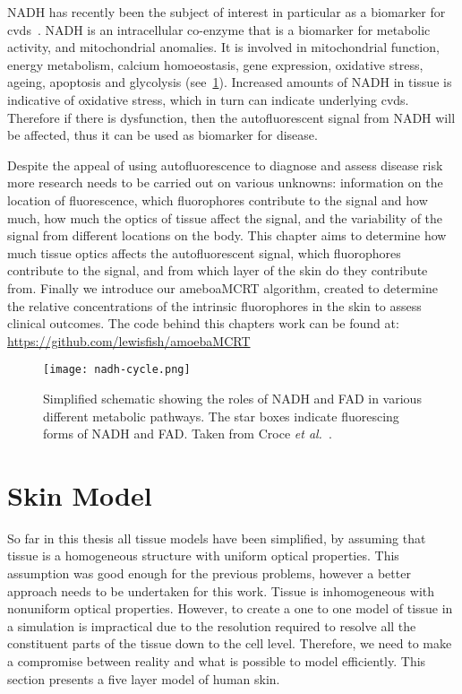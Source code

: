 NADH has recently been the subject of interest in particular as a biomarker for \gls*{cvds}~\cite{akbar2014vivo,elahi2009oxidative,blacker2016investigating}.
NADH is an intracellular co-enzyme that is a biomarker for metabolic activity, and mitochondrial anomalies. 
It is involved in mitochondrial function, energy metabolism, calcium homoeostasis, gene expression, oxidative stress, ageing, apoptosis and glycolysis (see~\cref{fig:nadhfadpath}).
Increased amounts of NADH in tissue is indicative of oxidative stress, which in turn can indicate underlying \gls*{cvds}.
Therefore if there is dysfunction, then the autofluorescent signal from NADH will be affected, thus it can be used as biomarker for disease.

Despite the appeal of using autofluorescence to diagnose and assess disease risk more research needs to be carried out on various unknowns: information on the location of fluorescence, which fluorophores contribute to the signal and how much, how much the optics of tissue affect the signal, and the variability of the signal from different locations on the body.
This chapter aims to determine how much tissue optics affects the autofluorescent signal, which fluorophores contribute to the signal, and from which layer of the skin do they contribute from.
Finally we introduce our ameboaMCRT algorithm, created to determine the relative concentrations of the intrinsic fluorophores in the skin to assess clinical outcomes.
The code behind this chapters work can be found at: \url{https://github.com/lewisfish/amoebaMCRT}

\begin{figure}[!htpb]
  \centering
  \texttt{[image: nadh-cycle.png]}
  \caption{Simplified schematic showing the roles of NADH and FAD in various different metabolic pathways. The star boxes indicate fluorescing forms of NADH and FAD. Taken from Croce \textit{et al.}~\cite{croce2014autofluorescence}.}
  \label{fig:nadhfadpath}
\end{figure}


\FloatBarrier

\section{Skin Model}

So far in this thesis all tissue models have been simplified, by assuming that tissue is a homogeneous structure with uniform optical properties.
This assumption was good enough for the previous problems, however a better approach needs to be undertaken for this work.
Tissue is inhomogeneous with nonuniform optical properties.
However, to create a one to one model of tissue in a simulation is impractical due to the resolution required to resolve all the constituent parts of the tissue down to the cell level.
Therefore, we need to make a compromise between reality and what is possible to model efficiently.
This section presents a five layer model of human skin. 

